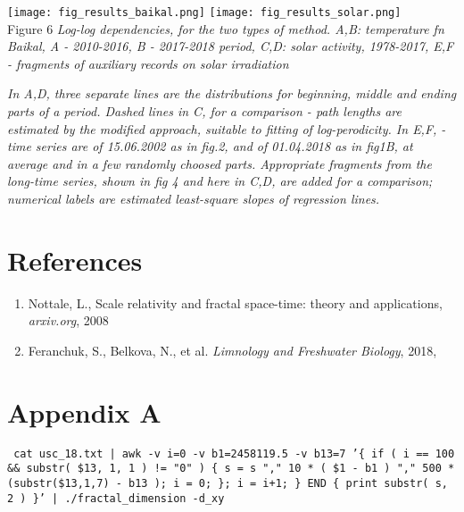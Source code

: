\documentclass[a4paper]{article}
\begin{document}
\vskip 12pt
\texttt{[image: fig\_results\_baikal.png]}
\texttt{[image: fig\_results\_solar.png]}\\
Figure 6 \textit{Log-log dependencies, for the two types of method. A,B: temperature fn Baikal, A - 2010-2016, B - 2017-2018 period, C,D: solar activity, 1978-2017, E,F - fragments of auxiliary records on solar irradiation}

\textit{\small{In A,D, three separate lines are the distributions for beginning, middle and ending parts of a period. Dashed lines in C, for a comparison - path lengths are estimated by the modified approach,  suitable to fitting of log-perodicity. In E,F, - time series are of 15.06.2002 as in fig.2, and of 01.04.2018 as in fig1B, at average and in a few randomly choosed parts. Appropriate fragments from the long-time series, shown in fig 4 and here in C,D, are added for a comparison; numerical labels are estimated least-square slopes of regression lines.}}

\section*{References}

\begin{enumerate}

\item Nottale, L., Scale relativity and fractal space-time: theory and applications, \textit{arxiv.org}, 2008

\item Feranchuk, S., Belkova, N., et al. \textit{Limnology and Freshwater Biology}, 2018,

\end{enumerate}

\newpage
\section*{Appendix A}


\texttt{\small{ cat usc\_18.txt | awk -v i=0 -v b1=2458119.5 -v b13=7 '\{ if ( i == 100 \&\& substr( \$13, 1, 1 ) != "0" ) \{ s = s "," 10 * ( \$1 - b1 ) "," 500 * (substr(\$13,1,7) - b13 ); i = 0; \}; i = i+1; \} END \{ print substr( s, 2 ) \}' | ./fractal\_dimension -d\_xy }}


\end{document}
